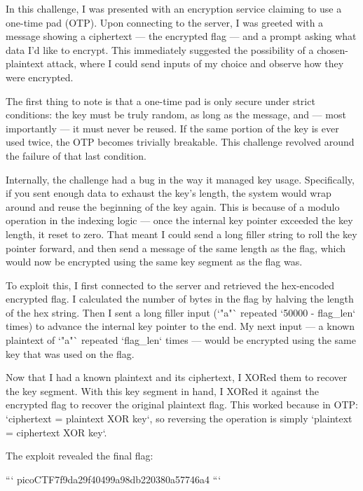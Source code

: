 In this challenge, I was presented with an encryption service claiming to use a one-time pad (OTP). Upon connecting to the server, I was greeted with a message showing a ciphertext — the encrypted flag — and a prompt asking what data I’d like to encrypt. This immediately suggested the possibility of a chosen-plaintext attack, where I could send inputs of my choice and observe how they were encrypted.

The first thing to note is that a one-time pad is only secure under strict conditions: the key must be truly random, as long as the message, and — most importantly — it must never be reused. If the same portion of the key is ever used twice, the OTP becomes trivially breakable. This challenge revolved around the failure of that last condition.

Internally, the challenge had a bug in the way it managed key usage. Specifically, if you sent enough data to exhaust the key’s length, the system would wrap around and reuse the beginning of the key again. This is because of a modulo operation in the indexing logic — once the internal key pointer exceeded the key length, it reset to zero. That meant I could send a long filler string to roll the key pointer forward, and then send a message of the same length as the flag, which would now be encrypted using the same key segment as the flag was.

To exploit this, I first connected to the server and retrieved the hex-encoded encrypted flag. I calculated the number of bytes in the flag by halving the length of the hex string. Then I sent a long filler input (`"a"` repeated `50000 - flag_len` times) to advance the internal key pointer to the end. My next input — a known plaintext of `"a"` repeated `flag_len` times — would be encrypted using the same key that was used on the flag.

Now that I had a known plaintext and its ciphertext, I XORed them to recover the key segment. With this key segment in hand, I XORed it against the encrypted flag to recover the original plaintext flag. This worked because in OTP: `ciphertext = plaintext XOR key`, so reversing the operation is simply `plaintext = ciphertext XOR key`.

The exploit revealed the final flag:

```
picoCTF{7f9da29f40499a98db220380a57746a4}
```


